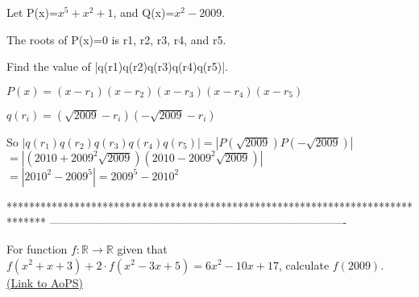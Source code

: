 \begin{solution}
	\begin{tcolorbox}Let P(x)=$ x^5 + x^2 + 1$, and Q(x)=$ x^2 - 2009$.

The roots of P(x)=0 is r1, r2, r3, r4, and r5.

Find the value of |q(r1)q(r2)q(r3)q(r4)q(r5)|.\end{tcolorbox}

$ P(x)=(x-r_1)(x-r_2)(x-r_3)(x-r_4)(x-r_5)$

$ q(r_i)=(\sqrt{2009}-r_i)(-\sqrt{2009}-r_i)$

So $ |q(r_1)q(r_2)q(r_3)q(r_4)q(r_5)|=|P(\sqrt{2009})P(-\sqrt{2009})|$ $ =|(2010+2009^2\sqrt{2009})(2010-2009^2\sqrt{2009})|$ $ =|2010^2-2009^5|=2009^5-2010^2$
\end{solution}



*******************************************************************************
-------------------------------------------------------------------------------

\begin{problem}
	For function $ f: \mathbb{R} \to \mathbb{R}$ given that $ f(x^2 +x +3) +2 \cdot f(x^2 - 3x + 5) = 6x^2 - 10x +17$, calculate $ f(2009)$.
	\flushright \href{https://artofproblemsolving.com/community/c6h272967}{(Link to AoPS)}
\end{problem}



